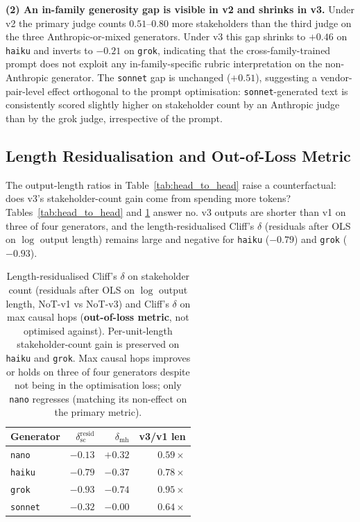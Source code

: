 \documentclass[11pt]{article}
\begin{document}
\textbf{(2) An in-family generosity gap is visible in v2 and shrinks in v3.}
Under v2 the primary judge counts $0.51$--$0.80$ more stakeholders than the third judge on the three Anthropic-or-mixed generators.
Under v3 this gap shrinks to $+0.46$ on \texttt{haiku} and inverts to $-0.21$ on \texttt{grok}, indicating that the cross-family-trained prompt does not exploit any in-family-specific rubric interpretation on the non-Anthropic generator.
The \texttt{sonnet} gap is unchanged ($+0.51$), suggesting a vendor-pair-level effect orthogonal to the prompt optimisation: \texttt{sonnet}-generated text is consistently scored slightly higher on stakeholder count by an Anthropic judge than by the grok judge, irrespective of the prompt.

\subsection{Length Residualisation and Out-of-Loss Metric}
\label{sec:residual}

The output-length ratios in Table~\ref{tab:head_to_head} raise a counterfactual: does v3's stakeholder-count gain come from spending more tokens?
Tables~\ref{tab:head_to_head} and \ref{tab:resid} answer no.
v3 outputs are shorter than v1 on three of four generators, and the length-residualised Cliff's $\delta$ (residuals after OLS on $\log$ output length) remains large and negative for \texttt{haiku} ($-0.79$) and \texttt{grok} ($-0.93$).

\begin{table}[t]
\centering\small
\begin{tabular}{lrrr}
\toprule
Generator & $\delta^{\text{resid}}_{\text{sc}}$ & $\delta_{\text{mh}}$ & v3/v1 len \\
\midrule
\texttt{nano}   & $-0.13$ & $+0.32$ & $0.59\times$ \\
\texttt{haiku}  & $-0.79$ & $-0.37$ & $0.78\times$ \\
\texttt{grok}   & $-0.93$ & $-0.74$ & $0.95\times$ \\
\texttt{sonnet} & $-0.32$ & $-0.00$ & $0.64\times$ \\
\bottomrule
\end{tabular}
\caption{Length-residualised Cliff's $\delta$ on stakeholder count (residuals after OLS on $\log$ output length, NoT-v1 vs NoT-v3) and Cliff's $\delta$ on max causal hops (\textbf{out-of-loss metric}, not optimised against).
Per-unit-length stakeholder-count gain is preserved on \texttt{haiku} and \texttt{grok}.
Max causal hops improves or holds on three of four generators despite not being in the optimisation loss; only \texttt{nano} regresses (matching its non-effect on the primary metric).}
\label{tab:resid}
\end{table}
\end{document}
